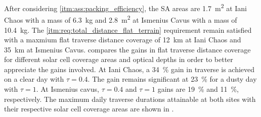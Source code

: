 After considering \ref{itm:ass:packing_efficiency}, the \ac{SA} areas are \SI{1.7}{m^{2}} at Iani Chaos with a mass of \SI{6.3}{\kilo\gram} and \SI{2.8}{m^{2}} at Ismenius Cavus with a mass of  \SI{10.4}{\kilo\gram}. The \ref{itm:req:total_distance_flat_terrain} requirement remain satisfied with
a maxmium flat traverse distance coverage of \SI{12}{\kilo\meter} at Iani Chaos and \SI{35}{\kilo\meter} at Ismenius Cavus.  compares the gains in flat traverse distance coverage for different solar cell coverage areas and optical depths in order to better appreciate the gains involved. At Iani Chaos, a \SI{34}{\percent} gain in traverse is achieved on a clear day with $\tau = 0.4$. The gain remains significant at \SI{23}{\percent} for a dusty day with $\tau = 1$. At Ismenius cavus, $\tau = 0.4$ and $\tau = 1$ gains are \SI{19}{\percent} and \SI{11}{\percent}, respectively. The maximum daily traverse durations attainable at both sites with their respective solar cell coverage areas are shown in .


